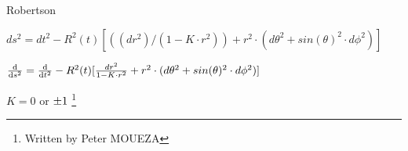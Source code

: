 \documentclass{article}
\date{1st february 1966}
\begin{document}





Robertson

$ds^2=dt^2-R^2(t)[((dr^2)/(1-K \cdot r^2))+r^2 \cdot (d\theta^2+sin(\theta)^2 \cdot d\phi ^2)]$

$\dv{s^2} = \dv{t^2} -R^2(t)[\frac{dr^2}{1-K \cdot r^2}+r^2 \cdot (d\theta^2+sin(\theta)^2 \cdot d\phi ^2)] \quad$

$K=0$  or  $ \SI{  \pm 1}{ } $
\footnote{Written by Peter MOUEZA}
\end{document}
